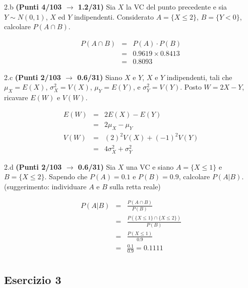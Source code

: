 \documentclass[
  11pt,
]{book}
\theoremstyle{mytheoremstyle}
\theoremstyle{mydefstyle}
\newenvironment{sol}
  {
  \begin{tcolorbox}[enhanced,breakable,arc=0.1mm,boxrule=1pt,colback=white,colframe=iblue,
  title=\bf \fontfamily{lmss}\selectfont \hspace{.5 cm} Soluzione,drop fuzzy shadow]

}{
\end{tcolorbox}
  }
\begin{document}
2.b \textbf{(Punti 4/103 \(\rightarrow\) 1.2/31)} Sia \(X\) la VC del punto precedente e sia \(Y\sim N(0,1)\), \(X\) ed \(Y\) indipendenti. Considerato \(A=\{X\leq 2\}\), \(B=\{Y<0\}\), calcolare \(P(A\cap B)\).

\begin{sol}
\begin{eqnarray}
      P( A \cap B ) &=& P( A )\cdot P( B ) \\
                         &=&  0.9619 \times 0.8413  \\
                         &=&  0.8093 \end{eqnarray}

\end{sol}

2.c \textbf{(Punti 2/103 \(\rightarrow\) 0.6/31)} Siano \(X\) e \(Y\), \(X\) e \(Y\) indipendenti, tali che \(\mu_X=E(X)\), \(\sigma_X^2=V(X)\), \(\mu_Y=E(Y)\), e \(\sigma_Y^2=V(Y)\). Posto \(W=2X-Y\), ricavare \(E(W)\) e \(V(W)\).

\begin{sol}
\begin{eqnarray*}
 E(W) &=& 2E(X) - E(Y)\\
      &=& 2\mu_X - \mu_Y\\
V(W)  &=& (2)^2V(X)+(-1)^2V(Y)\\
      &=& 4\sigma_X^2 + \sigma_Y^2
\end{eqnarray*}

\end{sol}

2.d \textbf{(Punti 2/103 \(\rightarrow\) 0.6/31)} Sia \(X\) una VC e siano \(A=\{X\le 1\}\) e \(B=\{X \le 2\}\). Sapendo che
\(P(A)=0.1\) e \(P(B)=0.9\), calcolare \(P( A|  B)\). (suggerimento: individuare \(A\) e \(B\) sulla retta reale)

\begin{sol}
\begin{eqnarray*}
P(A|B) &=& \frac{P(A\cap B)}{P(B)}\\
       &=& \frac{P(\{X\le 1\}\cap\{X \le 2\})}{P(B)}\\
       &=& \frac{P(X \le 1)}{0.9}\\
       &=& \frac{0.1}{0.9}=0.1111\\
\end{eqnarray*}

\end{sol}

\subsection{Esercizio 3}\label{esercizio-3-46}
\end{document}
